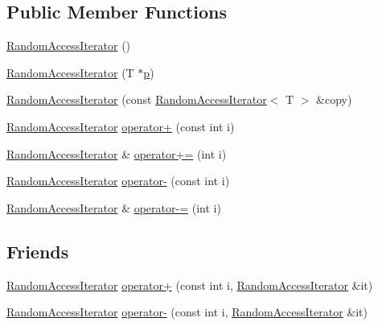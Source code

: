 \subsection*{Public Member Functions}
\begin{DoxyCompactItemize}
\item 
\hyperlink{classprism_1_1containers_1_1_random_access_iterator_ab033cdd961b49b45a58c114d26111436}{Random\+Access\+Iterator} ()
\item 
\hyperlink{classprism_1_1containers_1_1_random_access_iterator_a4aa572a036f1080164c65d796cb11d36}{Random\+Access\+Iterator} (T $\ast$\hyperlink{classprism_1_1containers_1_1_forward_iterator_afae3bf32acc98ab535b9bdb8156ba58f}{p})
\item 
\hyperlink{classprism_1_1containers_1_1_random_access_iterator_a54355f56f55f53b6425d592032d65608}{Random\+Access\+Iterator} (const \hyperlink{classprism_1_1containers_1_1_random_access_iterator}{Random\+Access\+Iterator}$<$ T $>$ \&copy)
\item 
\hyperlink{classprism_1_1containers_1_1_random_access_iterator}{Random\+Access\+Iterator} \hyperlink{classprism_1_1containers_1_1_random_access_iterator_a9fbb597e9d80b5ec8ab66ef1115b0407}{operator+} (const int i)
\item 
\hyperlink{classprism_1_1containers_1_1_random_access_iterator}{Random\+Access\+Iterator} \& \hyperlink{classprism_1_1containers_1_1_random_access_iterator_aabfa3b38040ac09902afe9a0a6b3a229}{operator+=} (int i)
\item 
\hyperlink{classprism_1_1containers_1_1_random_access_iterator}{Random\+Access\+Iterator} \hyperlink{classprism_1_1containers_1_1_random_access_iterator_afbe9b5662060b9ac21daec2a994d897b}{operator-\/} (const int i)
\item 
\hyperlink{classprism_1_1containers_1_1_random_access_iterator}{Random\+Access\+Iterator} \& \hyperlink{classprism_1_1containers_1_1_random_access_iterator_a10da042bcb52c486ec226e26907134e3}{operator-\/=} (int i)
\end{DoxyCompactItemize}
\subsection*{Friends}
\begin{DoxyCompactItemize}
\item 
\hyperlink{classprism_1_1containers_1_1_random_access_iterator}{Random\+Access\+Iterator} \hyperlink{classprism_1_1containers_1_1_random_access_iterator_af54fbcdeeec8255f8e3d2742c952ea22}{operator+} (const int i, \hyperlink{classprism_1_1containers_1_1_random_access_iterator}{Random\+Access\+Iterator} \&it)
\item 
\hyperlink{classprism_1_1containers_1_1_random_access_iterator}{Random\+Access\+Iterator} \hyperlink{classprism_1_1containers_1_1_random_access_iterator_a207fb9ff199d97104c08cc684db50dfe}{operator-\/} (const int i, \hyperlink{classprism_1_1containers_1_1_random_access_iterator}{Random\+Access\+Iterator} \&it)
\end{DoxyCompactItemize}

